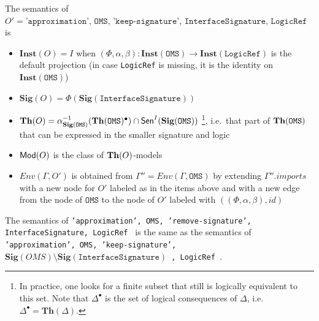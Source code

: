 \documentclass[10pt,fleqn,%
\ifpretendfinal
final%
\else
draft%
\fi,
]{scrreprt}
\newcommand*{\syntax}[1]{\texttt{#1}}
\newcommand{\Sig}{\mathbf{Sig}}
\newcommand{\Inst}{\ensuremath{\mathbf{Inst}}}
\begin{document}
The semantics of $O' = \syntax{'approximation', OMS, 
'keep-signature', InterfaceSignature, LogicRef }$ is
\begin{itemize}
  \item $\Inst(O) = I$ when $(\Phi,\alpha,\beta) : \Inst(\syntax{OMS}) \to \Inst(\syntax{LogicRef})$ is the default projection (in case \syntax{LogicRef} is missing, it is the identity on $\Inst(\syntax{OMS})$)
  \item $\Sig(O) =
   \Phi(\Sig(\syntax{InterfaceSignature}))$
  \item $\Th(O) = \alpha^{-1}_{\Sig(\syntax{OMS})}(\Th(\syntax{OMS})^\bullet)\cap\Sen^I(\Sig(\syntax{OMS}))$
  \footnote{In practice, one looks for a finite subset that still is logically equivalent to this set. Note that $\Delta^\bullet$ is the set of logical consequences of $\Delta$, i.e.\ $\Delta^\bullet = \mathbf{Th}(\Delta)$.}, i.e.\ that part of $\Th(\syntax{OMS})$ that can be expressed in the smaller signature and logic 
  \item $\mathsf{Mod}(O)$ is the class of $\mathbf{Th}(O)$-models
  \item $Env(\Gamma, O')$ is obtained from 
       $\Gamma'' = Env(\Gamma, \syntax{OMS})$
       by extending $\Gamma''.imports$
        with a new node for $O'$ labeled as in the items above
        and with a new edge from the node of $\syntax{OMS}$ to the node of $O'$ 
        labeled with $((\Phi,\alpha,\beta),id)$ 

\end{itemize}

The semantics of 
\syntax{'approximation', OMS, 
'remove-signature', InterfaceSignature, LogicRef }
is the same as the semantics of
\syntax{'approximation', OMS, 
'keep-signature', $\Sig(OMS)\setminus \Sig(\syntax{InterfaceSignature})$ , LogicRef }.


\end{document}
